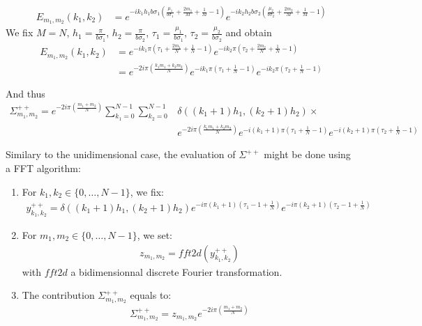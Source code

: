 \begin{align*}
E_{m_1,m_2}(k_1,k_2)
 &= e^{-ik_1h_1b\sigma_1\left(\frac{\mu_1}{b\sigma_1}+\frac{2m_1}{M}+\frac{1}{M}-1\right)}
    e^{-ik_2h_2b\sigma_2\left(\frac{\mu_2}{b\sigma_2}+\frac{2m_2}{M}+\frac{1}{M}-1\right)}
\end{align*}
We fix $M=N$, $h_1=\frac{\pi}{b\sigma_1}$, $h_2=\frac{\pi}{b\sigma_2}$, $\tau_1=\frac{\mu_1}{b\sigma_1}$, $\tau_2=\frac{\mu_2}{b\sigma_2}$ and obtain
\begin{align*}
E_{m_1,m_2}(k_1,k_2)
 &= e^{-ik_1\pi\left(\tau_1+\frac{2m_1}{N}+\frac{1}{N}-1\right)}
    e^{-ik_2\pi\left(\tau_2+\frac{2m_2}{N}+\frac{1}{N}-1\right)}\\
 &= e^{-2i\pi\left(\frac{k_1m_1+k_2m_2}{N}\right)}
    e^{-ik_1\pi\left(\tau_1+\frac{1}{N}-1\right)}
    e^{-ik_2\pi\left(\tau_2+\frac{1}{N}-1\right)}
\end{align*}

And thus
\begin{align*}
\Sigma_{m_1,m_2}^{++}=e^{-2i\pi\left(\frac{m_1+m_2}{N}\right)}\sum_{k_1=0}^{N-1}\sum_{k_2=0}^{N-1}
  &\delta\left((k_1+1)h_1,(k_2+1)h_2\right) \times\\
  & e^{-2i\pi\left(\frac{k_1m_1+k_2m_2}{N}\right)}
    e^{-i(k_1+1)\pi\left(\tau_1+\frac{1}{N}-1\right)}
    e^{-i(k_2+1)\pi\left(\tau_2+\frac{1}{N}-1\right)}
\end{align*}

Similary to the unidimensional case, the evaluation of $\Sigma^{++}$ might be done using a FFT algorithm:
\begin{enumerate}
\item For $k_1,k_2\in\{0,\hdots,N-1\}$, we fix:
\begin{align*}
y^{++}_{k_1,k_2}=\delta((k_1+1)h_1,(k_2+1)h_2)e^{-i\pi (k_1+1)\left(\tau_1-1+\frac{1}{N}\right)}e^{-i\pi (k_2+1)\left(\tau_2-1+\frac{1}{N}\right)}
\end{align*}
\item For $m_1,m_2\in\{0,\hdots,N-1\}$, we set:
\begin{align*}
  z_{m_1,m_2}=fft2d(y^{++}_{k_1,k_2})
\end{align*}
with $fft2d$ a bidimensionnal discrete Fourier transformation.
\item The contribution $\Sigma_{m_1,m_2}^{++}$ equals to:
\begin{align*}
  \Sigma_{m_1,m_2}^{++}=z_{m_1,m_2}e^{-2i\pi\left(\frac{m_1+m_2}{N}\right)}
\end{align*}
\end{enumerate}

